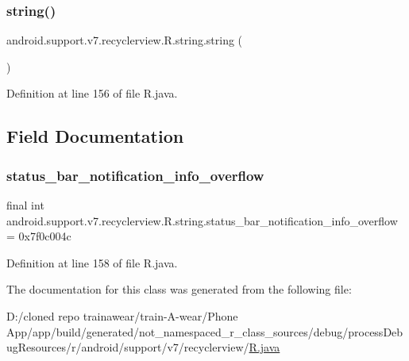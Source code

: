 \subsubsection{\texorpdfstring{string()}{string()}}
{\footnotesize\ttfamily android.\+support.\+v7.\+recyclerview.\+R.\+string.\+string (\begin{DoxyParamCaption}{ }\end{DoxyParamCaption})\hspace{0.3cm}{\ttfamily [private]}}



Definition at line 156 of file R.\+java.


\begin{DoxyCode}{0}

\end{DoxyCode}


\subsection{Field Documentation}
\mbox{\label{classandroid_1_1support_1_1v7_1_1recyclerview_1_1_r_1_1string_a1ea81bbbfacad9218b17fd12e0b9b258}} 
\subsubsection{\texorpdfstring{status\_bar\_notification\_info\_overflow}{status\_bar\_notification\_info\_overflow}}
{\footnotesize\ttfamily final int android.\+support.\+v7.\+recyclerview.\+R.\+string.\+status\+\_\+bar\+\_\+notification\+\_\+info\+\_\+overflow = 0x7f0c004c\hspace{0.3cm}{\ttfamily [static]}}



Definition at line 158 of file R.\+java.



The documentation for this class was generated from the following file\+:\begin{DoxyCompactItemize}
\item 
D\+:/cloned repo trainawear/train-\/\+A-\/wear/\+Phone App/app/build/generated/not\+\_\+namespaced\+\_\+r\+\_\+class\+\_\+sources/debug/process\+Debug\+Resources/r/android/support/v7/recyclerview/\mbox{\hyperlink{process_debug_resources_2r_2android_2support_2v7_2recyclerview_2_r_8java}{R.\+java}}\end{DoxyCompactItemize}
